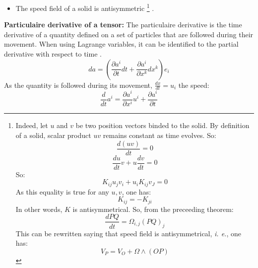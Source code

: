 \documentclass[12pt]{book}
\begin{document}
\begin{exmp}
\begin{itemize}
\item The speed field of a solid is antisymmetric
\footnote{%
Indeed, let  $u$ and $v$ be two position vectors binded to the solid. By
definition of 
a solid, scalar product $uv$ remains constant as time evolves. So:
\begin{equation}
\frac{d(uv)}{dt}=0
\end{equation}
\begin{equation}
\frac{du}{dt}v+u\frac{dv}{dt}=0
\end{equation}
So:
\begin{equation}
K_{ij}u_jv_i+u_iK_{ij}v_J=0
\end{equation}
As this equality is true for any $u,v$, one has:
\begin{equation}
K_{ij}=-K_{ji}
\end{equation}
In other words, $K$ is antisymmetrical. So, from the preceeding theorem:
\begin{equation}
\frac{dPQ}{dt}=\Omega_{i,j}(PQ)_j
\end{equation}
This can be rewritten saying that speed field is antisymmetrical, {\it i. e.},
one has: 
\begin{equation}
V_P=V_O+\Omega\wedge(OP)
\end{equation}
}%
.
\end{itemize}

\end{exmp}

\begin{exmp}\label{exmppartder}{\bf Particulaire derivative of a tensor:}
The particulaire derivative is the time derivative of a quantity defined on a
set of particles that are followed during their movement.
When using Lagrange variables, it can be identified to the partial derivative
with respect to time \cite{ph:fluid:Germain80}.
\begin{equation}\label{eqformalder}
da=(\frac{\partial a^i}{\partial t}dt  + \frac{\partial a^i}{\partial
x^k}dx^k) e_i
\end{equation}
As the quantity is followed during its movement, $\frac{dx}{dt}=u_i$ the speed:
\begin{equation}
\frac{d}{dt}a^i=\frac{\partial a^i}{\partial x^i}u^i+\frac{\partial
a^i}{\partial t}
\end{equation}
\end{exmp}
\end{document}
